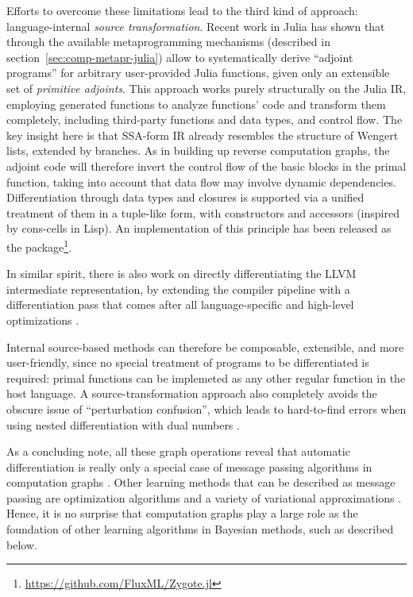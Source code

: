 Efforts to overcome these limitations lead to the third kind of approach: language-internal
\emph{source transformation}.  Recent work in Julia \parencite{innes2018don} has shown that through
the available metaprogramming mechanisms (described in section~\ref{sec:comp-metapr-julia}) allow to
systematically derive \enquote{adjoint programs} for arbitrary user-provided Julia functions, given
only an extensible set of \emph{primitive adjoints}.  This approach works purely structurally on the
Julia IR, employing generated functions to analyze functions' code and transform them completely,
including third-party functions and data types, and control flow.  The key insight here is that
SSA-form IR already resembles the structure of Wengert lists, extended by branches.  As in building
up reverse computation graphs, the adjoint code will therefore invert the control flow of the basic
blocks in the primal function, taking into account that data flow may involve dynamic dependencies.
Differentiation through data types and closures is supported via a unified treatment of them in a
tuple-like form, with constructors and accessors (inspired by cons-cells in Lisp).  An
implementation of this principle has been released as the 
package\footnote{\url{https://github.com/FluxML/Zygote.jl}}.

In similar spirit, there is also work on directly differentiating the LLVM intermediate
representation, by extending the compiler pipeline with a differentiation pass that comes after all
language-specific and high-level optimizations \parencite{moses2020instead}.

Internal source-based methods can therefore be composable, extensible, and more user-friendly, since
no special treatment of programs to be differentiated is required: primal functions can be
implemeted as any other regular function in the host language.  A source-transformation approach
also completely avoids the obscure issue of \enquote{perturbation confusion}, which leads to
hard-to-find errors when using nested differentiation with dual numbers
\parencite{baydin2018automatic,manzyuk2019perturbation}.

As a concluding note, all these graph operations reveal that automatic differentiation is really
only a special case of message passing algorithms in computation graphs
\parencite{minka2019automatic}.  Other learning methods that can be described as message passing are
optimization algorithms \parencite{ruozzi2011message,dauwels2005steepest} and a variety of
variational approximations \parencite{winn2005variational,minka2005divergence}.  Hence, it is no
surprise that computation graphs play a large role as the foundation of other learning algorithms in
Bayesian methods, such as described below.

